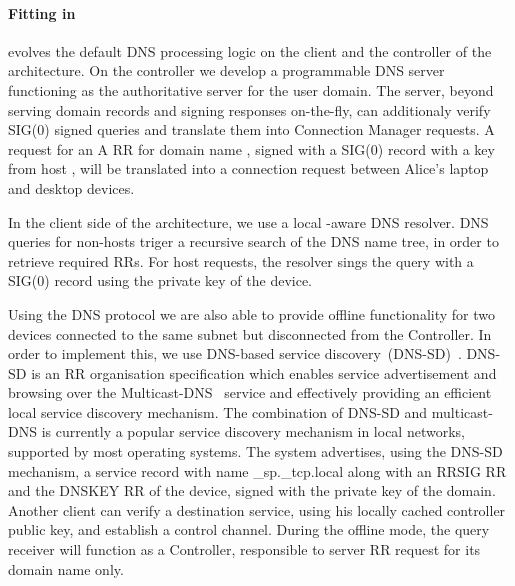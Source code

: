 
\paragraph{Fitting \dnssec in \signpost} 

\signpost evolves the default DNS processing logic on the client and the
controller of the architecture. On the controller we develop a programmable DNS
server functioning as the authoritative server for the user domain. The server,
beyond serving domain records and signing responses on-the-fly, can additionaly
verify SIG(0) signed queries and translate them into Connection Manager
requests. A request for an A RR for domain name , signed with
a SIG(0) record with a key from host , will be translated
into a connection request between Alice's laptop and desktop devices.  

In the client side of the \signpost architecture, we use a local \signpost-aware
DNS resolver. DNS queries for non-\signpost hosts triger a recursive search of
the DNS name tree, in order to retrieve required RRs.  For \signpost host
requests, the resolver sings the query with a SIG(0) record using the private
key of the device. 

Using the DNS protocol we are also able to provide offline functionality for two
devices connected to the same subnet but disconnected from the \signpost
Controller. In order to implement this, we use DNS-based service
discovery~(DNS-SD)~\cite{RFC6763}.  DNS-SD is an RR organisation specification
which enables service advertisement and browsing over the
Multicast-DNS~\cite{RFC6762} service and effectively providing an efficient
local service discovery mechanism. The combination of DNS-SD and multicast-DNS
is currently a popular service discovery mechanism in local networks, supported
by most operating systems.  The \signpost system advertises, using the DNS-SD
mechanism, a \signpost service record with name \_sp.\_tcp.local 
along with an RRSIG RR and the DNSKEY RR of the device, signed with the
private key of the domain. Another \signpost client can verify a
destination \signpost service, using his locally cached controller public key,
and establish a control channel. 
During the offline  mode, the query receiver will function as a \signpost
Controller, responsible to server RR request for its domain name only. 

